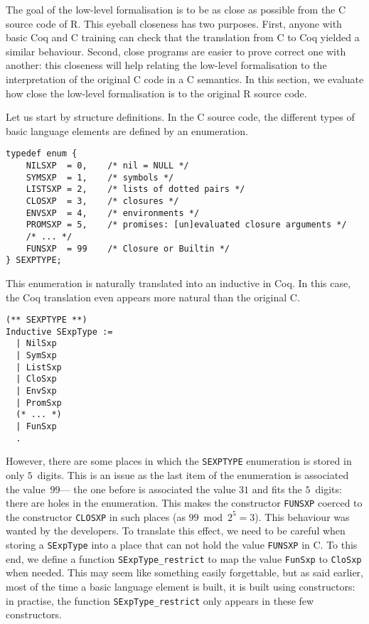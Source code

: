 \documentclass{article}
\newcommand\Coq{Coq}
\newcommand\R{R}
\newcommand\Cn{C}
\begin{document}
The goal of the low-level formalisation is to be as close as possible
from the \Cn{} source code of \R{}.
This eyeball closeness has two purposes.
First, anyone with basic \Coq{} and \Cn{} training
can check that the translation from \Cn{} to \Coq{} yielded
a similar behaviour.
Second, close programs are easier to prove correct one with another:
this closeness will help relating the low-level formalisation
to the interpretation of the original \Cn{} code in a \Cn{} semantics.
In this section, we evaluate how close the low-level formalisation
is to the original \R{} source code.

Let us start by structure definitions.
In the \Cn{} source code, the different types of basic language elements
are defined by an enumeration.
\begin{verbatim}
typedef enum {
    NILSXP  = 0,    /* nil = NULL */
    SYMSXP  = 1,    /* symbols */
    LISTSXP = 2,    /* lists of dotted pairs */
    CLOSXP  = 3,    /* closures */
    ENVSXP  = 4,    /* environments */
    PROMSXP = 5,    /* promises: [un]evaluated closure arguments */
    /* ... */
    FUNSXP  = 99    /* Closure or Builtin */
} SEXPTYPE;
\end{verbatim}
This enumeration is naturally translated into an inductive in \Coq{}.
In this case,
the \Coq{} translation even appears more natural than the original \Cn{}.
\begin{verbatim}
(** SEXPTYPE **)
Inductive SExpType :=
  | NilSxp
  | SymSxp
  | ListSxp
  | CloSxp
  | EnvSxp
  | PromSxp
  (* ... *)
  | FunSxp
  .
\end{verbatim}
However, there are some places in which the \texttt{SEXPTYPE}
enumeration is stored in only \(5\)~digits.
This is an issue as the last item of the enumeration
is associated the value~\(99\)—%
the one before is associated the value \(31\) and fits the \(5\)~digits:
there are holes in the enumeration.
This makes the constructor \texttt{FUNSXP} coerced
to the constructor \texttt{CLOSXP} in such places
(as \(99 \bmod 2^5 = 3\)).
This behaviour was wanted by the developers.
To translate this effect,
we need to be careful when storing a \texttt{SExpType}
into a place that can not hold the value \texttt{FUNSXP} in \Cn{}.
To this end, we define a function
\texttt{SExpType_restrict} to map the value
\texttt{FunSxp} to \texttt{CloSxp} when needed.
This may seem like something easily forgettable,
but as said earlier, most of the time a basic language element is built,
it is built using constructors:
in practise, the function \texttt{SExpType_restrict}
only appears in these few constructors.
\end{document}
